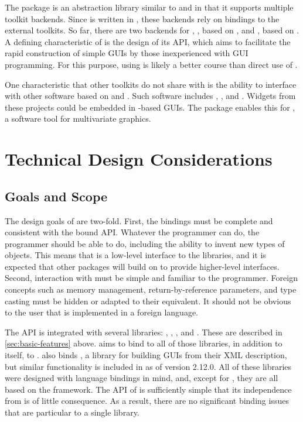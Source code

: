 \documentclass[article]{jss}
\begin{document}
The  package  \citep{gwidgets} is an abstraction library similar to
 and  in that it supports multiple toolkit backends.
Since  is written in , these backends rely on 
bindings to the external toolkits. So far, there are two backends for 
, , based on , and ,
based on . A defining characteristic of  is the
design of its API, which aims to facilitate the rapid construction of simple 
GUIs by those inexperienced with GUI programming. For this purpose, using 
 is likely a better course than direct use of .

One characteristic that other toolkits do not share with  is the 
ability to interface with other software based on  and .
Such software includes , , and . 
Widgets from these projects could be embedded in -based GUIs. The 
package enables this for , a software tool for multivariate graphics. 

\section{Technical Design Considerations}

\subsection{Goals and Scope}

The design goals of  are two-fold. First, the bindings must be
complete and consistent with the bound API. Whatever the  programmer
can do, the  programmer should be able to do, including the ability
to invent new types of objects. This means that  is a low-level
interface to the  libraries, and it is expected that other
packages will build on  to provide higher-level interfaces. Second, 
interaction with  must
be simple and familiar to the  programmer. Foreign  concepts such
as memory management, return-by-reference parameters, and type casting
must be hidden or adapted to their  equivalent. It should not be
obvious to the user that  is implemented in a foreign language.

The  API is integrated with several libraries: , 
, ,  and . These are described
in \ref{sec:basic-features} above.  aims to bind to all of those
libraries, in addition to  itself, to . 
also binds , a library for building GUIs from their XML description,
but similar functionality is included in  as of version 2.12.0. All
of these libraries were designed with language bindings in mind, and, except
for , they are all based on the  framework. The API of
 is sufficiently simple that its independence from  is
of little consequence. As a result, there are no significant binding issues that
are particular to a single library. 
\end{document}
